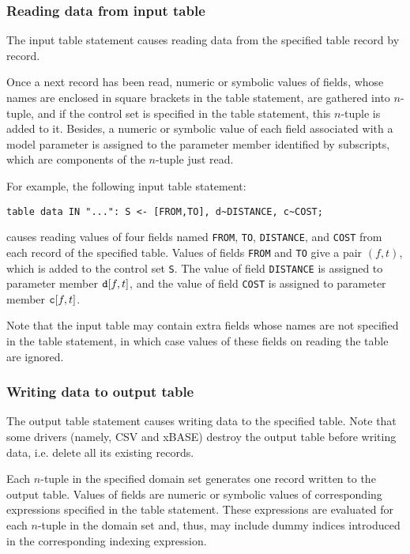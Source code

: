 \documentclass[10pt]{article}
\begin{document}
\subsubsection{Reading data from input table}

The input table statement causes reading data from the specified table
record by record.

Once a next record has been read, numeric or symbolic values of fields,
whose names are enclosed in square brackets in the table statement, are
gathered into $n$-tuple, and if the control set is specified in the
table statement, this $n$-tuple is added to it. Besides, a numeric or
symbolic value of each field associated with a model parameter is
assigned to the parameter member identified by subscripts, which are
components of the $n$-tuple just read.

For example, the following input table statement:

\medskip

\noindent\hfil
\verb|table data IN "...": S <- [FROM,TO], d~DISTANCE, c~COST;|

\medskip

\noindent
causes reading values of four fields named {\tt FROM}, {\tt TO},
{\tt DISTANCE}, and {\tt COST} from each record of the specified table.
Values of fields {\tt FROM} and {\tt TO} give a pair $(f,t)$, which is
added to the control set {\tt S}. The value of field {\tt DISTANCE} is
assigned to parameter member ${\tt d}[f,t]$, and the value of field
{\tt COST} is assigned to parameter member ${\tt c}[f,t]$.

Note that the input table may contain extra fields whose names are not
specified in the table statement, in which case values of these fields
on reading the table are ignored.

\subsubsection{Writing data to output table}

The output table statement causes writing data to the specified table.
Note that some drivers (namely, CSV and xBASE) destroy the output table
before writing data, i.e. delete all its existing records.

Each $n$-tuple in the specified domain set generates one record written
to the output table. Values of fields are numeric or symbolic values of
corresponding expressions specified in the table statement. These
expressions are evaluated for each $n$-tuple in the domain set and,
thus, may include dummy indices introduced in the corresponding indexing
expression.
\end{document}
